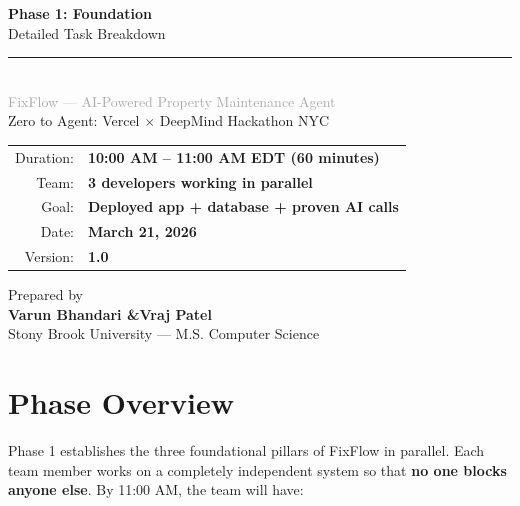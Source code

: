 \documentclass[11pt, a4paper]{article}
\begin{document}
\begin{titlepage}
\centering
\vspace*{2cm}

{\Huge\bfseries\textcolor{primary}{Phase 1: Foundation}}\\[0.6cm]
{\LARGE\textcolor{accent}{Detailed Task Breakdown}}\\[0.3cm]
\textcolor{accent}{\rule{0.6\textwidth}{1.5pt}}\\[1cm]

{\Large\textcolor{darkgray}{FixFlow --- AI-Powered Property Maintenance Agent}}\\[0.5cm]
{\large\textcolor{textmuted}{Zero to Agent: Vercel $\times$ DeepMind Hackathon NYC}}\\[2cm]

\begin{tabular}{rl}
\textcolor{textmuted}{Duration:} & \textbf{10:00 AM -- 11:00 AM EDT (60 minutes)} \\[6pt]
\textcolor{textmuted}{Team:} & \textbf{3 developers working in parallel} \\[6pt]
\textcolor{textmuted}{Goal:} & \textbf{Deployed app + database + proven AI calls} \\[6pt]
\textcolor{textmuted}{Date:} & \textbf{March 21, 2026} \\[6pt]
\textcolor{textmuted}{Version:} & \textbf{1.0} \\
\end{tabular}

\vfill

{\normalsize\textcolor{textmuted}{Prepared by}}\\[4pt]
{\large\textbf{Varun Bhandari \quad\&\quad Vraj Patel}}\\[2pt]
{\small\textcolor{textmuted}{Stony Brook University --- M.S. Computer Science}}

\end{titlepage}

\section{Phase Overview}

Phase 1 establishes the three foundational pillars of FixFlow in parallel. Each team member works on a completely independent system so that \textbf{no one blocks anyone else}. By 11:00 AM, the team will have:
\end{document}
